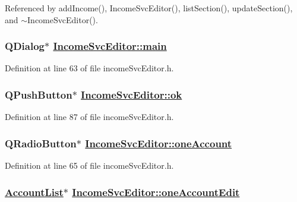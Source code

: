 Referenced by add\-Income(), Income\-Svc\-Editor(), list\-Section(), update\-Section(), and $\sim$Income\-Svc\-Editor().\hypertarget{classIncomeSvcEditor_r6}{
\subsubsection[main]{\setlength{\rightskip}{0pt plus 5cm}QDialog$\ast$ \hyperlink{classIncomeSvcEditor_r6}{Income\-Svc\-Editor::main}}}
\label{classIncomeSvcEditor_r6}


Definition at line 63 of file income\-Svc\-Editor.h.\hypertarget{classIncomeSvcEditor_r30}{
\subsubsection[ok]{\setlength{\rightskip}{0pt plus 5cm}QPush\-Button$\ast$ \hyperlink{classIncomeSvcEditor_r30}{Income\-Svc\-Editor::ok}}}
\label{classIncomeSvcEditor_r30}


Definition at line 87 of file income\-Svc\-Editor.h.\hypertarget{classIncomeSvcEditor_r8}{
\subsubsection[oneAccount]{\setlength{\rightskip}{0pt plus 5cm}QRadio\-Button$\ast$ \hyperlink{classIncomeSvcEditor_r8}{Income\-Svc\-Editor::one\-Account}}}
\label{classIncomeSvcEditor_r8}


Definition at line 65 of file income\-Svc\-Editor.h.\hypertarget{classIncomeSvcEditor_r12}{
\subsubsection[oneAccountEdit]{\setlength{\rightskip}{0pt plus 5cm}\hyperlink{classAccountList}{Account\-List}$\ast$ \hyperlink{classIncomeSvcEditor_r12}{Income\-Svc\-Editor::one\-Account\-Edit}}}
\label{classIncomeSvcEditor_r12}


